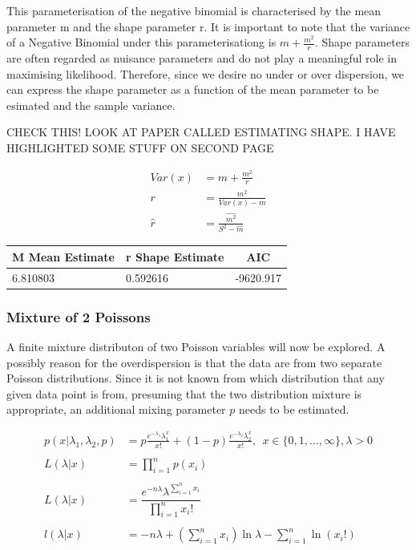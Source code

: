 \documentclass[11pt,preprint, authoryear]{elsarticle}
\numberwithin{equation}{section}
\numberwithin{figure}{section}
\numberwithin{table}{section}
\begin{document}
This parameterisation of the negative binomial is characterised by the
mean parameter m and the shape parameter r. It is important to note that
the variance of a Negative Binomial under this parameterisationg is
\(m + \frac{m^2}{r}\). Shape parameters are often regarded as nuisance
parameters and do not play a meaningful role in maximising likelihood.
Therefore, since we desire no under or over dispersion, we can express
the shape parameter as a function of the mean parameter to be esimated
and the sample variance.

CHECK THIS! LOOK AT PAPER CALLED ESTIMATING SHAPE. I HAVE HIGHLIGHTED
SOME STUFF ON SECOND PAGE

\begin{align*}
Var(x) &= m + \frac{m^2}{r} \\
r &= \frac{m^2}{Var(x) - m} \\
\hat{r} &= \frac{\hat{m^2}}{S^2 - \hat{m}}
\end{align*}

\begin{longtable}[]{@{}llc@{}}
\toprule
M Mean Estimate & r Shape Estimate & AIC\tabularnewline
\midrule
\endhead
6.810803 & 0.592616 & -9620.917\tabularnewline
\bottomrule
\end{longtable}

\subsubsection{Mixture of 2 Poissons}\label{mixture-of-2-poissons}

A finite mixture distributon of two Poisson variables will now be
explored. A possibly reason for the overdispersion is that the data are
from two separate Poisson distributions. Since it is not known from
which distribution that any given data point is from, presuming that the
two distribution mixture is appropriate, an additional mixing parameter
\(p\) needs to be estimated.

\begin{align*} 
p(x|\lambda_1,\lambda_2,p) & =  p\frac{e^{-\lambda_1} \lambda_1^x}{x!} + (1-p)\frac{e^{-\lambda_2} \lambda_2^x}{x!},\ \ x\in \{0,1,\ldots,\infty\},\lambda>0 \\
\\
L(\lambda|x) & = \prod_{i=1}^n p(x_i) \\
\\
L(\lambda|x) & =\dfrac{e^{-n\lambda}\lambda^{\sum_{i=1}^n x_i}}{\prod_{i=1}^n x_i!}\\
\\
l(\lambda|x) & =-n\lambda +  \left(\sum_{i=1}^n x_i\right)\ln \lambda - \sum_{i=1}^{n}\ln(x_i!)
\end{align*}
\end{document}
